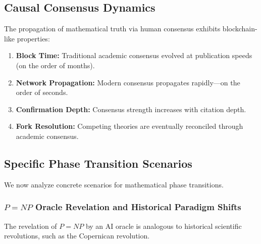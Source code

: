 \documentclass[11pt]{article}
\begin{document}
\subsection{Causal Consensus Dynamics}

The propagation of mathematical truth via human consensus exhibits blockchain-like properties:
\begin{enumerate}[label=(\arabic*)]
    \item \textbf{Block Time:} Traditional academic consensus evolved at publication speeds (on the order of months).
    \item \textbf{Network Propagation:} Modern consensus propagates rapidly––on the order of seconds.
    \item \textbf{Confirmation Depth:} Consensus strength increases with citation depth.
    \item \textbf{Fork Resolution:} Competing theories are eventually reconciled through academic consensus.
\end{enumerate}

\subsection{Specific Phase Transition Scenarios}

We now analyze concrete scenarios for mathematical phase transitions.

\subsubsection{$P=NP$ Oracle Revelation and Historical Paradigm Shifts}

The revelation of $P=NP$ by an AI oracle is analogous to historical scientific revolutions, such as the Copernican revolution.
\end{document}
